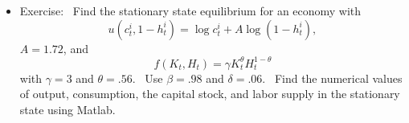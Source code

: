 \documentclass[notes=show]{beamer}
\begin{document}
\begin{frame}%


\begin{itemize}
\item Exercise: \ Find the stationary state equilibrium for an economy with 
\[
u\left( c_{t}^{i},1-h_{t}^{i}\right) =\log c_{t}^{i}+A\log \left(
1-h_{t}^{i}\right) , 
\]%
$A=1.72$, and%
\[
f\left( K_{t},H_{t}\right) =\gamma K_{t}^{\theta }H_{t}^{1-\theta } 
\]%
with $\gamma =3$ and $\theta =.56$. \ Use $\beta =.98$ and $\delta =.06.$ \
Find the numerical values of output, consumption, the capital stock, and
labor supply in the stationary state using Matlab. \ 
\end{itemize}

\end{frame}%
\end{document}
